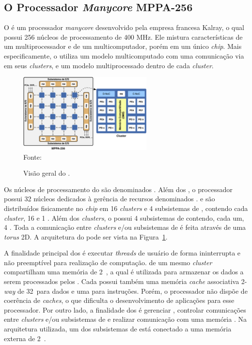 \subsection{O Processador \textit{Manycore} MPPA-256}
\label{sec:mppa}

O \mppa é um processador \textit{manycore} desenvolvido pela empresa francesa
Kalray, o qual possui 256 núcleos de processamento de 400 MHz. Ele mistura características
de um multiprocessador e de um multicomputador, porém em um único \textit{chip}.
Mais especificamente, o \mppa utiliza um modelo multicomputado com uma
comunicação via \noc em seus \textit{clusters}, e um modelo multiprocessado
dentro de cada \textit{cluster}.

\begin{figure}[t]
	\centering
	\caption{Visão geral do \mppa.}
	\includegraphics[width=0.6\textwidth]{figs/mppa-overall.pdf} \\
    Fonte:~\cite{Castro-IA3:2013}
	\label{fig:mppa}
\end{figure}

Os núcleos de processamento do \mppa são denominados \pes.
Além dos \pes, o processador possui 32 núcleos dedicados à gerência de recursos
denominados  \rmans. \pes e \rmans são distribuídos
fisicamente no \textit{chip} em 16 \textit{clusters} e 4 subsistemas de \es,
contendo cada \textit{cluster}, 16 \pes e 1 \rman. Além dos \textit{clusters}, o
\mppa possui 4 subsistemas de \es contendo, cada um, 4 \rmans. Toda a comunicação
entre \textit{clusters} e/ou subsistemas de \es é feita através de uma \noc
\textit{torus} 2D. A arquitetura do \mppa pode ser vista na Figura~\ref{fig:mppa}.

A finalidade principal dos \pes é executar \textit{threads} de usuário de forma
ininterrupta e não preemptível para realização de computação. \pes de um mesmo
\textit{cluster} compartilham uma memória de 2~\mb, a qual é utilizada para
armazenar os dados a serem processados pelos \pes. Cada \pe possui também uma
memória \textit{cache} associativa 2-\textit{way} de 32~\kb para dados e uma para
instruções. Porém, o processador não dispõe de coerência de \textit{caches}, o
que dificulta o desenvolvimento de aplicações para esse processador. Por outro
lado, a finalidade dos \rmans é gerenciar \es, controlar comunicações entre
\textit{clusters} e/ou subsistemas de \es e realizar comunicação com uma memória
\ram. Na arquitetura utilizada, um dos subsistemas de \es está conectado a uma
memória externa \lpddr de 2~\gb.

